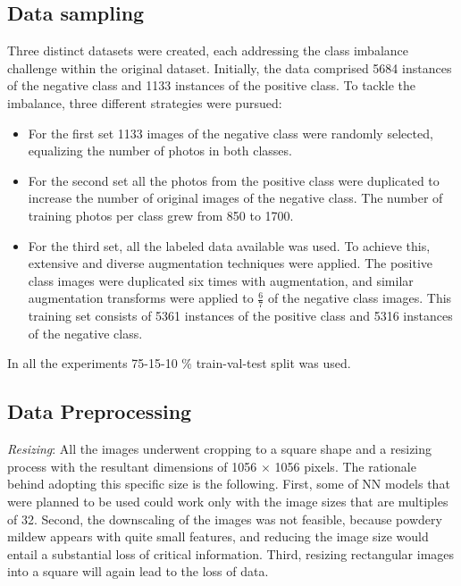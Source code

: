 \begin{description}
\subsection{Data sampling}
\label{Data_sampling}
Three distinct datasets were created, each addressing the class imbalance challenge within the original dataset. Initially, the data comprised 5684 instances of the negative class and 1133 instances of the positive class.
To tackle the imbalance, three different strategies were pursued:
\begin{itemize}
    \item For the first set 1133 images of the negative class were randomly selected, equalizing the number of photos in both classes.
    \item For the second set all the photos from the positive class were duplicated to increase the number of original images of the negative class. The number of training photos per class grew from 850 to 1700.
    \item For the third set, all the labeled data available was used. To achieve this, extensive and diverse augmentation techniques were applied. The positive class images were duplicated six times with augmentation, and similar augmentation transforms were applied to $\frac{6}{7}$ of the negative class images. This training set consists of 5361 instances of the positive class and 5316 instances of the negative class.
\end{itemize}

In all the experiments 75-15-10 \% train-val-test split was used.
\subsection{Data Preprocessing}
\textit{Resizing}: All the images underwent cropping to a square shape and a resizing process with the resultant dimensions of 1056 $\times$ 1056 pixels.
The rationale behind adopting this specific size is the following.
First, some of NN models that were planned to be used could work only with the image sizes that are multiples of 32.
Second, the downscaling of the images was not feasible, because powdery mildew appears with quite small features, and reducing the image size would entail a substantial loss of critical information.
Third, resizing rectangular images into a square will again lead to the loss of data.


\end{description}
